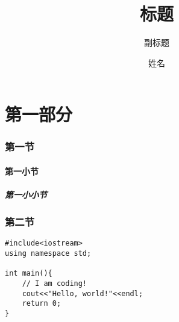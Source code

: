 \documentclass[UTF8,a4paper,heading=true]{ctexart}
\subtitle{副标题}
\author{姓名}
\begin{document}
    \title{标题}
    \maketitle
    \tableofcontents
    \part{第一部分}
    \section{第一节}
    \subsection{第一小节}
    \subsubsection{第一小小节}
    \section{第二节}
    \clearpage
    \lstset{language=c++}
    \begin{lstlisting}[caption=test.cpp]
#include<iostream>
using namespace std;

int main(){
    // I am coding!
    cout<<"Hello, world!"<<endl;
    return 0;
}
\end{lstlisting}
\end{document}
